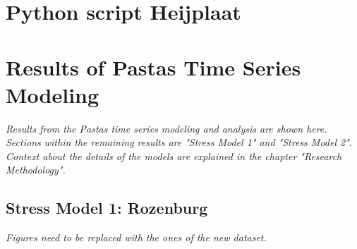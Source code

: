 \section{Python script Heijplaat}



\newpage
\section{Results of Pastas Time Series Modeling}
\emph{Results from the Pastas time series modeling and analysis are shown here. Sections within the remaining results are "Stress Model 1" and "Stress Model 2". Context about the details of the models are explained in the chapter "Research Methodology".}

\subsection{Stress Model 1: Rozenburg}
\textit{Figures need to be replaced with the ones of the new dataset.}
